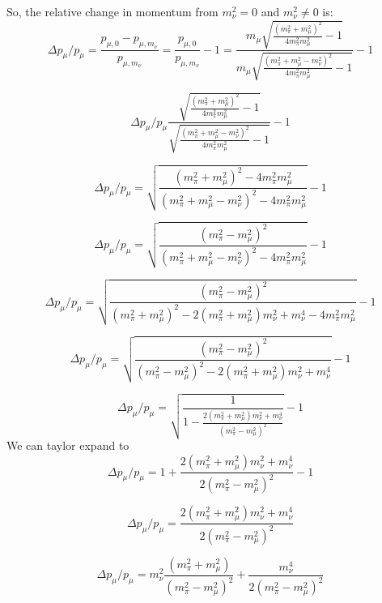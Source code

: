 \documentclass[a4paper]{article}
\begin{document}
So, the relative change in momentum from $m^2_{\nu} = 0$ and $m^2_{\nu} \neq 0$ is:
\begin{equation} \Delta p_{\mu}/p_{\mu} = \frac{p_{\mu,0} - p_{\mu,m_{\nu}}}{p_{\mu,m_{\nu} }} =  \frac{p_{\mu,0}}{p_{\mu,m_{\nu}}} -1 = 
\frac{m_{\mu}\sqrt{\frac{(m^2_{\pi} + m^2_{\mu})^2}{4m^2_{\pi}m^2_{\mu}} - 1} }{m_{\mu}\sqrt{\frac{(m^2_{\pi} + m^2_{\mu} - m^2_{\nu})^2}{4m^2_{\pi}m^2_{\mu}} - 1}} - 1\end{equation} 

\begin{equation} \Delta p_{\mu}/p_{\mu} 
\frac{\sqrt{\frac{(m^2_{\pi} + m^2_{\mu})^2}{4m^2_{\pi}m^2_{\mu}} - 1} }{\sqrt{\frac{(m^2_{\pi} + m^2_{\mu} - m^2_{\nu})^2}{4m^2_{\pi}m^2_{\mu}} - 1}} - 1\end{equation} 

\begin{equation} \Delta p_{\mu}/p_{\mu} =
\sqrt{\frac{(m^2_{\pi} + m^2_{\mu})^2 - 4m^2_{\pi}m^2_{\mu}  }{(m^2_{\pi} + m^2_{\mu} - m^2_{\nu})^2 - 4m^2_{\pi}m^2_{\mu}}} - 1\end{equation} 

\begin{equation} \Delta p_{\mu}/p_{\mu} =
\sqrt{\frac{(m^2_{\pi} - m^2_{\mu})^2 }{(m^2_{\pi} + m^2_{\mu} - m^2_{\nu})^2 - 4m^2_{\pi}m^2_{\mu}}} - 1\end{equation} 

\begin{equation} \Delta p_{\mu}/p_{\mu} =
\sqrt{\frac{(m^2_{\pi} - m^2_{\mu})^2 }{(m^2_{\pi} + m^2_{\mu})^2 -2(m^2_{\pi} + m^2_{\mu})m^2_{\nu}+ m^4_{\nu} - 4m^2_{\pi}m^2_{\mu}}} - 1\end{equation} 

\begin{equation} \Delta p_{\mu}/p_{\mu} =
\sqrt{\frac{(m^2_{\pi} - m^2_{\mu})^2 }{(m^2_{\pi} - m^2_{\mu})^2 -2(m^2_{\pi} + m^2_{\mu})m^2_{\nu}+ m^4_{\nu} }} - 1\end{equation} 



\begin{equation} \Delta p_{\mu}/p_{\mu} =
\sqrt{\frac{1}{1 -\frac{2(m^2_{\pi} + m^2_{\mu})m^2_{\nu}+ m^4_{\nu} } {(m^2_{\pi} - m^2_{\mu})^2}} } - 1\end{equation} 
We can taylor expand to
\begin{equation} \Delta p_{\mu}/p_{\mu} =
1 + \frac{2(m^2_{\pi} + m^2_{\mu})m^2_{\nu}+ m^4_{\nu} }{2(m^2_{\pi} - m^2_{\mu})^2} - 1\end{equation} 

\begin{equation} \Delta p_{\mu}/p_{\mu} =
\frac{2(m^2_{\pi} + m^2_{\mu})m^2_{\nu}+ m^4_{\nu} }{2(m^2_{\pi} - m^2_{\mu})^2} \end{equation} 

\begin{equation} \Delta p_{\mu}/p_{\mu} =
m^2_{\nu}\frac{(m^2_{\pi} + m^2_{\mu})}{{(m^2_{\pi} - m^2_{\mu})^2}} + \frac{m^4_{\nu} }{2(m^2_{\pi} - m^2_{\mu})^2} \end{equation} 


 
\end{document}

